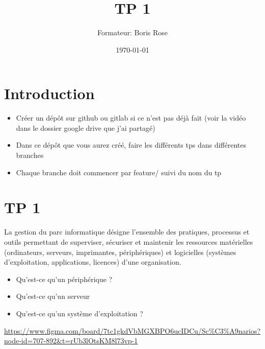 \documentclass[12pt, letterpaper]{article}
\title{TP 1}
\author{Formateur: Boris Rose}
\date{\today}
\begin{document}
\maketitle

\section*{Introduction}

\begin{tcolorbox}[colback=brown!5,colframe=brown!60!black,title=Consignes]

\begin{itemize}
    \item Créer un dépôt sur github ou gitlab si ce n'est pas déjà fait (voir la vidéo dans le dossier google drive que j'ai partagé)
    \item Dans ce dépôt que vous aurez créé, faire les différents tps dans différentes branches
    \item Chaque branche doit commencer par feature/ suivi du nom du tp 
\end{itemize}


\end{tcolorbox}


\section*{TP 1}

\begin{tcolorbox}[colback=cyan!5,colframe=cyan!60!black,title=Définition]
La gestion du parc informatique désigne l’ensemble des pratiques, processus et outils permettant de superviser, sécuriser et maintenir les ressources matérielles (ordinateurs, serveurs, imprimantes, périphériques) et logicielles (systèmes d’exploitation, applications, licences) d’une organisation.
\end{tcolorbox}

\begin{itemize}
    \item Qu'est-ce qu'un périphérique ?
    \item Qu'est-ce qu'un serveur
    \item Qu'est-ce qu'un système d'exploitation ?
\end{itemize}


\begin{tcolorbox}[colback=cyan!5,colframe=cyan!60!black,title=Figma du Cours]
    \url{https://www.figma.com/board/7tc1gkdVbMGXBPO6ucIDCu/Sc%C3%A9narios?node-id=707-892&t=rUb3lOtsKM8l73vp-1}
\end{tcolorbox}
\end{document}
